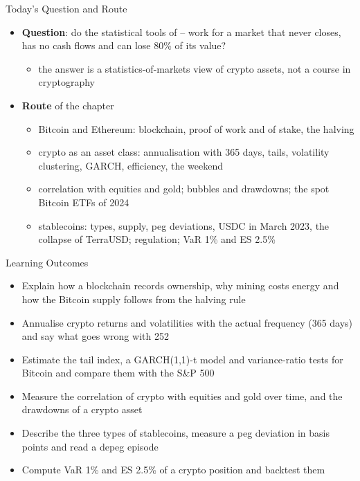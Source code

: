 \begin{frame}{Today's Question and Route}
\itemsize{\small}
\begin{itemize}
    \item \textbf{Question}: do the statistical tools of -- work for a market that never closes, has no cash flows and can lose 80\% of its value?
    \begin{itemize}
        \item the answer is a statistics-of-markets view of crypto assets, not a course in cryptography
    \end{itemize}
    \item \textbf{Route} of the chapter
    \begin{itemize}
        \item Bitcoin and Ethereum: blockchain, proof of work and of stake, the halving
        \item crypto as an asset class: annualisation with 365 days, tails, volatility clustering, GARCH, efficiency, the weekend
        \item correlation with equities and gold; bubbles and drawdowns; the spot Bitcoin ETFs of 2024
        \item stablecoins: types, supply, peg deviations, USDC in March 2023, the collapse of TerraUSD; regulation; VaR 1\% and ES 2.5\%
    \end{itemize}
\end{itemize}
\end{frame}

\begin{frame}{Learning Outcomes}
\itemsize{\small}
\begin{itemize}
    \item Explain how a blockchain records ownership, why mining costs energy and how the Bitcoin supply follows from the halving rule
    \item Annualise crypto returns and volatilities with the actual frequency (365 days) and say what goes wrong with 252
    \item Estimate the tail index, a GARCH(1,1)-t model and variance-ratio tests for Bitcoin and compare them with the S\&P 500
    \item Measure the correlation of crypto with equities and gold over time, and the drawdowns of a crypto asset
    \item Describe the three types of stablecoins, measure a peg deviation in basis points and read a depeg episode
    \item Compute VaR 1\% and ES 2.5\% of a crypto position and backtest them
\end{itemize}
\end{frame}

